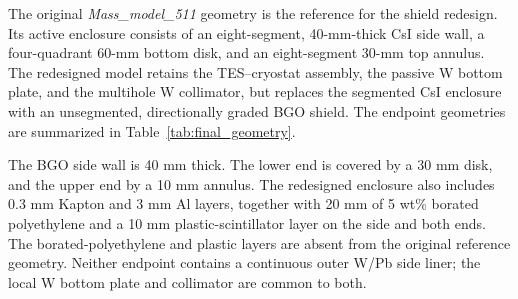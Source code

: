\documentclass[11pt]{article}
\begin{document}
The original \textit{Mass\_model\_511} geometry is the reference for the
shield redesign. Its active enclosure consists of an eight-segment, 40-mm-thick
CsI side wall, a four-quadrant 60-mm bottom disk, and an eight-segment 30-mm top
annulus. The redesigned model retains the TES--cryostat assembly, the passive W
bottom plate, and the multihole W collimator, but replaces the segmented CsI
enclosure with an unsegmented, directionally graded BGO shield. The endpoint
geometries are summarized in Table~\ref{tab:final_geometry}.

The BGO side wall is 40 mm thick.
The lower end is covered by a 30 mm disk, and the upper end by a 10 mm annulus.
The redesigned enclosure also includes 0.3 mm Kapton and 3 mm Al layers, together
with 20 mm of 5 wt\% borated polyethylene and a 10 mm plastic-scintillator layer on
the side and both ends. The borated-polyethylene and plastic layers are absent
from the original reference geometry. Neither endpoint contains a continuous
outer W/Pb side liner; the local W bottom plate and collimator are common to both.
\end{document}
